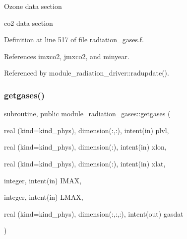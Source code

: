 \begin{DoxyItemize}
\item Ozone data section
\item co2 data section 
\end{DoxyItemize}

Definition at line 517 of file radiation\+\_\+gases.\+f.



References imxco2, jmxco2, and minyear.



Referenced by module\+\_\+radiation\+\_\+driver\+::radupdate().

\mbox{\label{group__module__radiation__gases_gacce60e9b372951eea9c6b3f28568e99c}} 
\subsubsection{\texorpdfstring{getgases()}{getgases()}}
{\footnotesize\ttfamily subroutine, public module\+\_\+radiation\+\_\+gases\+::getgases (\begin{DoxyParamCaption}\item[{real (kind=kind\+\_\+phys), dimension(\+:,\+:), intent(in)}]{plvl,  }\item[{real (kind=kind\+\_\+phys), dimension(\+:), intent(in)}]{xlon,  }\item[{real (kind=kind\+\_\+phys), dimension(\+:), intent(in)}]{xlat,  }\item[{integer, intent(in)}]{I\+M\+AX,  }\item[{integer, intent(in)}]{L\+M\+AX,  }\item[{real (kind=kind\+\_\+phys), dimension(\+:,\+:,\+:), intent(out)}]{gasdat }\end{DoxyParamCaption})}


